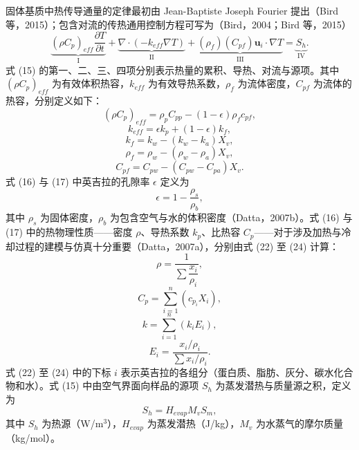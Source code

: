 \documentclass[11pt,a4paper]{ctexart}
\begin{document}
固体基质中热传导通量的定律最初由 Jean-Baptiste Joseph Fourier 提出（Bird 等，2015）；包含对流的传热通用控制方程可写为（Bird，2004；Bird 等，2015）
\begin{equation}
\underbrace{(\rho C_p)_{eff}\frac{\partial T}{\partial t}}_{\text{I}} + \underbrace{\nabla\cdot(-k_{eff}\nabla T)}_{\text{II}} + \underbrace{(\rho_f)(C_{pf})\bm{u}_i\cdot\nabla T}_{\text{III}} = \underbrace{S_h}_{\text{IV}}.
\end{equation}
式 (15) 的第一、二、三、四项分别表示热量的累积、导热、对流与源项。其中 $(\rho C_p)_{eff}$ 为有效体积热容，$k_{eff}$ 为有效导热系数，$\rho_f$ 为流体密度，$C_{pf}$ 为流体的热容，分别定义如下：
\begin{equation}
(\rho C_p)_{eff} = \rho_p C_{pp} - (1-\epsilon)\rho_f c_{pf},
\end{equation}
\begin{equation}
k_{eff} = \epsilon k_p + (1-\epsilon)k_f,
\end{equation}
\begin{equation}
k_f = k_w - (k_w - k_a)X_v,
\end{equation}
\begin{equation}
\rho_f = \rho_w - (\rho_w - \rho_a)X_v,
\end{equation}
\begin{equation}
C_{pf} = C_{pw} - (C_{pw} - C_{pa})X_v.
\end{equation}
式 (16) 与 (17) 中英吉拉的孔隙率 $\epsilon$ 定义为
\begin{equation}
\epsilon = 1 - \frac{\rho_s}{\rho_b},
\end{equation}
其中 $\rho_s$ 为固体密度，$\rho_b$ 为包含空气与水的体积密度（Datta，2007b）。式 (16) 与 (17) 中的热物理性质——密度 $\rho$、导热系数 $k_p$、比热容 $C_p$——对于涉及加热与冷却过程的建模与仿真十分重要（Datta，2007a），分别由式 (22) 至 (24) 计算：
\begin{equation}
\rho = \frac{1}{\sum \dfrac{x_i}{\rho_i}},
\end{equation}
\begin{equation}
C_p = \sum_{i=1}^{n}\left(c_{p_i}X_i\right),
\end{equation}
\begin{equation}
k = \sum_{i=1}^{n}\left(k_i E_i\right),
\end{equation}
\begin{equation}
E_i = \frac{x_i/\rho_i}{\sum x_i/\rho_i}.
\end{equation}
式 (22) 至 (24) 中的下标 $i$ 表示英吉拉的各组分（蛋白质、脂肪、灰分、碳水化合物和水）。式 (15) 中由空气界面向样品的源项 $S_h$ 为蒸发潜热与质量源之积，定义为
\begin{equation}
S_h = H_{evap}M_v S_m,
\end{equation}
其中 $S_h$ 为热源（W/m$^3$），$H_{evap}$ 为蒸发潜热（J/kg），$M_v$ 为水蒸气的摩尔质量（kg/mol）。
\end{document}
